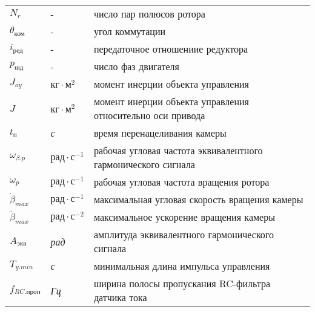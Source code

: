 \begin{longtabu}{X[-1,r]X[-1,l]X[l]}
    $N_{r}$                         & -             & число пар полюсов ротора \\

    $\theta_\textit{ком}$           & -             & угол коммутации \\

    $i_\textit{ред}$                & -             & передаточное отношениие редуктора \\

    $p_\textit{шд}$                 & -             & число фаз двигателя \\

    $J_{oy}$                        & $\textit{кг} \cdot \textit{м}^{2}$        & момент инерции объекта управления \\

    $J$                             & $\textit{кг} \cdot \textit{м}^{2}$        & момент инерции объекта управления относительно оси привода \\

    $t_\textit{п}$                  & \textit{с}                                & время перенацеливания камеры \\

    $\omega_{\beta.p}$              & $\textit{рад} \cdot \textit{с}^{-1}$      & рабочая угловая частота эквивалентного гармонического сигнала \\

    $\omega_{p}$                    & $\textit{рад} \cdot \textit{с}^{-1}$      & рабочая угловая частота вращения ротора \\

    $\dot{\beta}_{max}$             & $\textit{рад} \cdot \textit{с}^{-1}$      & максимальная угловая скорость вращения камеры \\

    $\ddot{\beta}_{max}$            & $\textit{рад} \cdot \textit{с}^{-2}$      & максимальное ускорение вращения камеры \\

    $A_{\textit{экв}}$              & \textit{рад}                              & амплитуда эквивалентного гармонического сигнала \\

    $T_{y.min}$                     & \textit{с}                                & минимальная длина импульса управления \\

    $f_{RC.\textit{проп}}$          & \textit{Гц}                               & ширина полосы пропускания RC-фильтра датчика тока \\


\end{longtabu}
